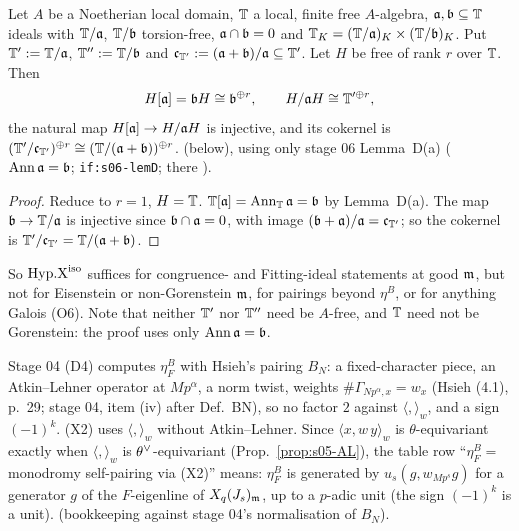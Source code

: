 \begin{proposition}\label{prop:s05-subquot}
Let $A$ be a Noetherian local domain, $\mathbb{T}$ a local, finite free $A$-algebra, $\mathfrak{a},\mathfrak{b}\subseteq\mathbb{T}$ ideals with
$\mathbb{T}/\mathfrak{a}$, $\mathbb{T}/\mathfrak{b}$ torsion-free, $\mathfrak{a}\cap\mathfrak{b}=0$ and $\mathbb{T}_K=(\mathbb{T}/\mathfrak{a})_K\times(\mathbb{T}/\mathfrak{b})_K$. Put $\mathbb{T}':=\mathbb{T}/\mathfrak{a}$, $\mathbb{T}'':=\mathbb{T}/\mathfrak{b}$ and
$\mathfrak{c}_{\mathbb{T}'}:=(\mathfrak{a}+\mathfrak{b})/\mathfrak{a}\subseteq\mathbb{T}'$. Let $H$ be free of rank $r$ over $\mathbb{T}$. Then
\[H[\mathfrak{a}]=\mathfrak{b} H\cong\mathfrak{b}^{\oplus r},\qquad H/\mathfrak{a} H\cong\mathbb{T}'^{\oplus r},\]
the natural map $H[\mathfrak{a}]\to H/\mathfrak{a} H$ is injective, and its cokernel is $(\mathbb{T}'/\mathfrak{c}_{\mathbb{T}'})^{\oplus r}\cong(\mathbb{T}/(\mathfrak{a}+\mathfrak{b}))^{\oplus r}$.
\stproved{} (below), using only stage 06 Lemma~D(a) ($\operatorname{Ann}\mathfrak{a}=\mathfrak{b}$; \texttt{if:s06-lemD}; there \stproved).
\end{proposition}
\begin{proof}
Reduce to $r=1$, $H=\mathbb{T}$. $\mathbb{T}[\mathfrak{a}]=\operatorname{Ann}_{\mathbb{T}}\mathfrak{a}=\mathfrak{b}$ by Lemma~D(a). The map $\mathfrak{b}\to\mathbb{T}/\mathfrak{a}$ is injective since $\mathfrak{b}\cap\mathfrak{a}=0$, with
image $(\mathfrak{b}+\mathfrak{a})/\mathfrak{a}=\mathfrak{c}_{\mathbb{T}'}$; so the cokernel is $\mathbb{T}'/\mathfrak{c}_{\mathbb{T}'}=\mathbb{T}/(\mathfrak{a}+\mathfrak{b})$.
\end{proof}
\noindent So $\mathrm{Hyp.X}^{\mathrm{iso}}$ suffices for congruence- and Fitting-ideal statements at good $\mathfrak{m}$, but not for Eisenstein or
non-Gorenstein $\mathfrak{m}$, for pairings beyond $\eta^B$, or for anything Galois (O6). Note that neither $\mathbb{T}'$ nor $\mathbb{T}''$ need be
$A$-free, and $\mathbb{T}$ need not be Gorenstein: the proof uses only $\operatorname{Ann}\mathfrak{a}=\mathfrak{b}$.

\begin{remark}\label{rem:s05-BN}
Stage 04 (D4) computes $\eta^B_F$ with Hsieh's pairing $B_N$: a fixed-character piece, an Atkin--Lehner operator at $Mp^\alpha$,
a norm twist, weights $\#\Gamma_{Np^\alpha,x}=w_x$ (Hsieh (4.1), p.~29; stage 04, item (iv) after Def.~BN), so no factor $2$ against
$\langle,\rangle_w$, and a sign $(-1)^k$.
 (X2) uses $\langle,\rangle_w$ without Atkin--Lehner. Since $\langle x,w\,y\rangle_w$ is $\theta$-equivariant exactly when
$\langle,\rangle_w$ is $\theta^\vee$-equivariant (Prop.~\ref{prop:s05-AL}), the table row ``$\eta^B_F=$ monodromy self-pairing via
(X2)'' means: $\eta^B_F$ is generated by $u_s(g,w_{Mp^s}g)$ for a generator $g$ of the $F$-eigenline of $X_q(J_s)_{\mathfrak{m}}$, up to a
$p$-adic unit (the sign $(-1)^k$ is a unit).  \sttoprove{} (bookkeeping against stage 04's
normalisation of $B_N$).
\end{remark}


